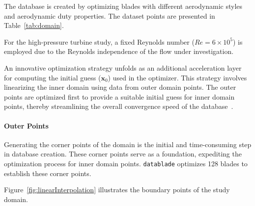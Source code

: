 \documentclass[11pt,a4paper,twocolumn]{article}
\begin{document}
The database is created by optimizing blades with different aerodynamic styles and aerodynamic duty properties. 
The dataset points are presented in Table~\ref{tab:domain}.

For the high-pressure turbine study, a fixed Reynolds number ($Re = 6 \times 10^5$) is employed due to the Reynolds independence of the flow under investigation.

An innovative optimization strategy unfolds as an additional acceleration layer for computing the initial guess ($\boldsymbol{x}_0$) used in the optimizer. This strategy involves linearizing the inner domain using data from outer domain points. The outer points are optimized first to provide a suitable initial guess for inner domain points, thereby streamlining the overall convergence speed of the database~\cite{clark2019step}.

\paragraph{Outer Points}


Generating the corner points of the domain is the initial and time-consuming step in database creation. These corner points serve as a foundation, expediting the optimization process for inner domain points. \texttt{datablade} optimizes 128 blades to establish these corner points.

Figure~\ref{fig:linearInterpolation} illustrates the boundary points of the study domain.
\end{document}
